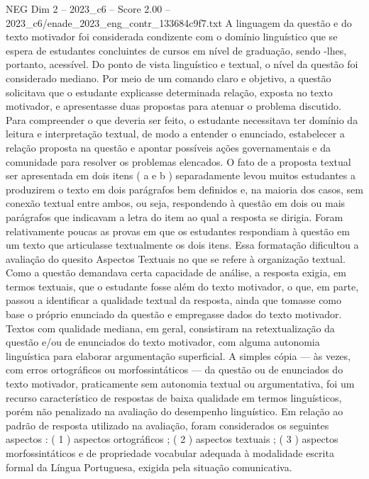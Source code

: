 \begin{textsample}{NEG Dim 2 – 2023\_c6 – Score 2.00 – 2023\_c6/enade\_2023\_eng\_contr\_133684c9f7.txt}
A linguagem da questão e do texto motivador foi considerada condizente com o domínio linguístico que se espera de estudantes concluintes de cursos em nível de graduação, sendo -lhes, portanto, acessível.
Do ponto de vista linguístico e textual, o nível da questão foi considerado mediano.
Por meio de um comando claro e objetivo, a questão solicitava que o estudante explicasse determinada relação, exposta no texto motivador, e apresentasse duas propostas para atenuar o problema discutido.
Para compreender o que deveria ser feito, o estudante necessitava ter domínio da leitura e interpretação textual, de modo a entender o enunciado, estabelecer a relação proposta na questão e apontar possíveis ações governamentais e da comunidade para resolver os problemas elencados.
O fato de a proposta textual ser apresentada em dois itens ( a e b ) separadamente levou muitos estudantes a produzirem o texto em dois parágrafos bem definidos e, na maioria dos casos, sem conexão textual entre ambos, ou seja, respondendo à questão em dois ou mais parágrafos que indicavam a letra do item ao qual a resposta se dirigia.
Foram relativamente poucas as provas em que os estudantes respondiam à questão em um texto que articulasse textualmente os dois itens.
Essa formatação dificultou a avaliação do quesito Aspectos Textuais no que se refere à organização textual.
Como a questão demandava certa capacidade de análise, a resposta exigia, em termos textuais, que o estudante fosse além do texto motivador, o que, em parte, passou a identificar a qualidade textual da resposta, ainda que tomasse como base o próprio enunciado da questão e empregasse dados do texto motivador.
Textos com qualidade mediana, em geral, consistiram na retextualização da questão e/ou de enunciados do texto motivador, com alguma autonomia linguística para elaborar argumentação superficial.
A simples cópia — às vezes, com erros ortográficos ou morfossintáticos — da questão ou de enunciados do texto motivador, praticamente sem autonomia textual ou argumentativa, foi um recurso característico de respostas de baixa qualidade em termos linguísticos, porém não penalizado na avaliação do desempenho linguístico.
Em relação ao padrão de resposta utilizado na avaliação, foram considerados os seguintes aspectos : ( 1 ) aspectos ortográficos ; ( 2 ) aspectos textuais ; ( 3 ) aspectos morfossintáticos e de propriedade vocabular adequada à modalidade escrita formal da Língua Portuguesa, exigida pela situação comunicativa.

\end{textsample}
